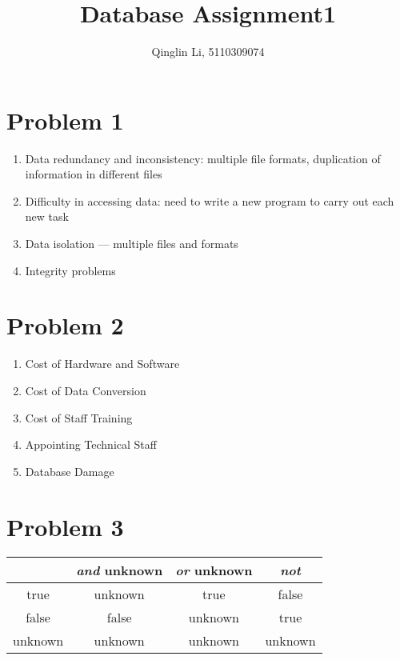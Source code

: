 \documentclass[12pt]{article}
\date{}
\title{Database Assignment1}
\author{Qinglin Li, 5110309074}
\begin{document}
\maketitle
\section*{Problem 1}
\begin{enumerate}
\item Data redundancy and inconsistency: multiple file formats, duplication of information in different files
\item Difficulty in accessing data: need to write a new program to carry out each new task 
\item Data isolation — multiple files and formats 
\item Integrity problems 
\end{enumerate}
\section*{Problem 2}
\begin{enumerate}
\item Cost of Hardware and Software
\item Cost of Data Conversion
\item Cost of Staff Training
\item Appointing Technical Staff
\item Database Damage
\end{enumerate}
\section*{Problem 3}
\begin{tabular}{|c|c|c|c|}
\hline 
 & \textit{\textbf{and}} unknown & \textit{\textbf{or}} unknown & \textit{\textbf{not}} \\ 
\hline 
true & unknown & true & false \\ 
\hline 
false & false & unknown & true \\ 
\hline 
unknown & unknown & unknown & unknown \\ 
\hline 
\end{tabular} 
\end{document}
